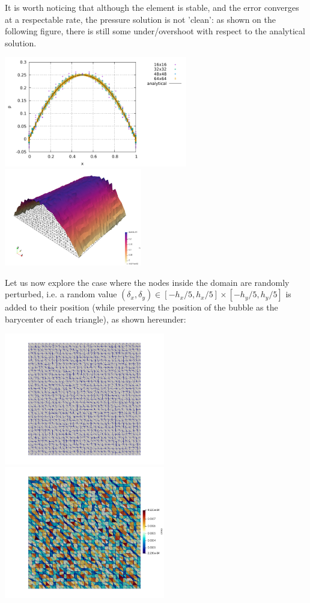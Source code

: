 It is worth noticing that although the element is stable, and the error converges
at a respectable rate, the pressure solution is not 'clean': as shown on the 
following figure, there is still some under/overshoot with respect to the analytical solution.

\begin{center}
\includegraphics[width=8cm]{python_codes/fieldstone_47/images/reg/pressure.pdf}
\includegraphics[width=6cm]{python_codes/fieldstone_47/images/rand/press}
\end{center}

Let us now explore the case where the nodes inside the domain are randomly perturbed, i.e. 
a random value  $(\delta_x,\delta_y)\in[-h_x/5,h_x/5]\times[-h_y/5,h_y/5]$ is added 
to their position (while preserving the position of the bubble as the barycenter of each triangle), 
as shown hereunder:

\begin{center}
\includegraphics[width=7cm]{python_codes/fieldstone_47/images/rand/grid}
\includegraphics[width=7cm]{python_codes/fieldstone_47/images/rand/areas}
\end{center}
 
